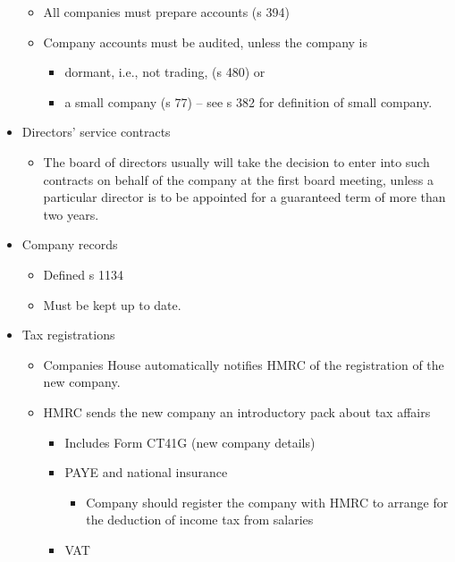 \documentclass[
]{article}
\providecommand{\tightlist}{%
  \setlength{\itemsep}{0pt}\setlength{\parskip}{0pt}}
\begin{document}
\begin{itemize}
  \begin{itemize}
  \tightlist
  \item
    All companies must prepare accounts (s 394)
  \item
    Company accounts must be audited, unless the company is

    \begin{itemize}
    \tightlist
    \item
      dormant, i.e., not trading, (s 480) or
    \item
      a small company (s 77) -- see s 382 for definition of small
      company.
    \end{itemize}
  \end{itemize}
\item
  Directors' service contracts

  \begin{itemize}
  \tightlist
  \item
    The board of directors usually will take the decision to enter into
    such contracts on behalf of the company at the first board meeting,
    unless a particular director is to be appointed for a guaranteed
    term of more than two years.
  \end{itemize}
\item
  Company records

  \begin{itemize}
  \tightlist
  \item
    Defined s 1134
  \item
    Must be kept up to date.
  \end{itemize}
\item
  Tax registrations

  \begin{itemize}
  \tightlist
  \item
    Companies House automatically notifies HMRC of the registration of
    the new company.
  \item
    HMRC sends the new company an introductory pack about tax affairs

    \begin{itemize}
    \tightlist
    \item
      Includes Form CT41G (new company details)
    \item
      PAYE and national insurance

      \begin{itemize}
      \tightlist
      \item
        Company should register the company with HMRC to arrange for the
        deduction of income tax from salaries
      \end{itemize}
    \item
      VAT


\end{itemize}
\end{itemize}
\end{itemize}
\end{document}
